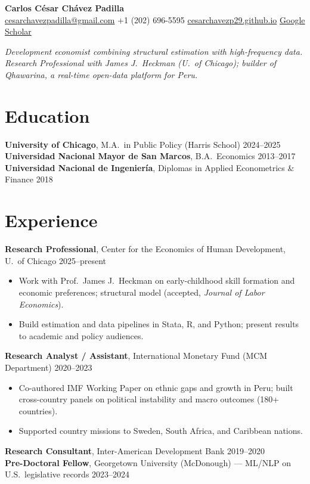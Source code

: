 \documentclass[10pt]{article}
\newcommand{\sep}{\;\textbar\;}
\begin{document}
\begin{center}
{\LARGE\bfseries\color{ink} Carlos César Chávez Padilla}\\[3pt]
\small \href{mailto:cesarchavezpadilla@gmail.com}{cesarchavezpadilla@gmail.com} \sep +1 (202) 696-5595 \sep
\href{https://cesarchavezp29.github.io}{cesarchavezp29.github.io} \sep
\href{https://scholar.google.com/citations?user=LsVe9yQAAAAJ}{Google Scholar}
\end{center}

\vspace{1pt}
{\small\itshape Development economist combining structural estimation with high-frequency data. Research Professional with James J.\ Heckman (U.\ of Chicago); builder of Qhawarina, a real-time open-data platform for Peru.}

\section{Education}
\textbf{University of Chicago}, M.A.\ in Public Policy (Harris School) \hfill 2024--2025 \\
\textbf{Universidad Nacional Mayor de San Marcos}, B.A.\ Economics \hfill 2013--2017 \\
\textbf{Universidad Nacional de Ingeniería}, Diplomas in Applied Econometrics \& Finance \hfill 2018

\section{Experience}
\textbf{Research Professional}, Center for the Economics of Human Development, U.\ of Chicago \hfill 2025--present
\begin{itemize}
\item Work with Prof.\ James J.\ Heckman on early-childhood skill formation and economic preferences; structural model (accepted, \textit{Journal of Labor Economics}).
\item Build estimation and data pipelines in Stata, R, and Python; present results to academic and policy audiences.
\end{itemize}
\textbf{Research Analyst / Assistant}, International Monetary Fund (MCM Department) \hfill 2020--2023
\begin{itemize}
\item Co-authored IMF Working Paper on ethnic gaps and growth in Peru; built cross-country panels on political instability and macro outcomes (180+ countries).
\item Supported country missions to Sweden, South Africa, and Caribbean nations.
\end{itemize}
\textbf{Research Consultant}, Inter-American Development Bank \hfill 2019--2020 \\
\textbf{Pre-Doctoral Fellow}, Georgetown University (McDonough) --- ML/NLP on U.S.\ legislative records \hfill 2023--2024
\end{document}

